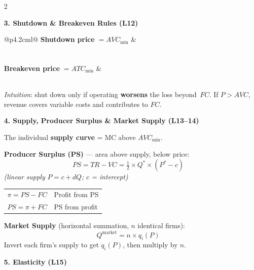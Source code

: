 \documentclass[9pt]{article}
\begin{document}
\begin{multicols}{2}
\begin{bluebox}
\textbf{\color{micro_blue}3. Shutdown \& Breakeven Rules (L12)}

\smallskip
\begin{tabular}{@{}p{4.2cm}l@{}}
\textbf{Shutdown price} $= AVC_{\min}$ & \\[3pt]
\\
\\[3pt]
\textbf{Breakeven price} $= ATC_{\min}$ & \\[3pt]
\\
\end{tabular}

\smallskip
\textit{Intuition}: shut down only if operating \textbf{worsens} the loss beyond~$FC$.
If $P > AVC$, revenue covers variable costs and contributes to $FC$.
\end{bluebox}

\begin{bluebox}
\textbf{\color{micro_blue}4. Supply, Producer Surplus \& Market Supply (L13--14)}

\smallskip
The individual \textbf{supply curve} = MC above $AVC_{\min}$.

\smallskip
\textbf{Producer Surplus (PS)} --- area above supply, below price:
\[
  PS = TR - VC = \tfrac{1}{2} \times Q^* \times (P^* - c)
\]
\textit{(linear supply $P = c + dQ$; $c$ = intercept)}

\begin{tabular}{@{}ll@{}}
$\pi = PS - FC$ & Profit from PS \\[3pt]
$PS = \pi + FC$ & PS from profit \\[3pt]
\end{tabular}

\smallskip
\textbf{Market Supply} (horizontal summation, $n$ identical firms):
\[
  Q^{\text{market}} = n \times q_i(P)
\]
Invert each firm's supply to get $q_i(P)$, then multiply by $n$.
\end{bluebox}

\columnbreak

\begin{bluebox}
\textbf{\color{micro_blue}5. Elasticity (L15)}


\end{bluebox}
\end{multicols}
\end{document}

